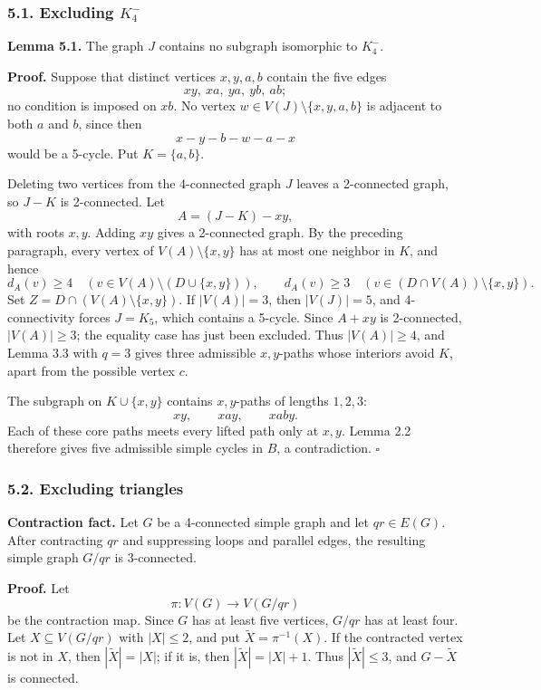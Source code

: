 \documentclass[
  11pt]{article}
\let\papersubsection\subsubsection
\renewcommand{\subsubsection}{\Needspace{7\baselineskip}\papersubsection}
\begin{document}
\subsubsection{\texorpdfstring{5.1. Excluding
\(K_4^-\)}{5.1. Excluding K\_4\^{}-}}\label{excluding-k_4-}

\textbf{Lemma 5.1.} The graph \(J\) contains no subgraph isomorphic to
\(K_4^-\).

\textbf{Proof.} Suppose that distinct vertices \(x,y,a,b\) contain the
five edges \[
 xy,\ xa,\ ya,\ yb,\ ab;
\] no condition is imposed on \(xb\). No vertex
\(w\in V(J)\setminus\{x,y,a,b\}\) is adjacent to both \(a\) and \(b\),
since then \[
 x-y-b-w-a-x
\] would be a 5-cycle. Put \(K=\{a,b\}\).


Deleting two vertices from the 4-connected graph \(J\) leaves a
2-connected graph, so \(J-K\) is 2-connected. Let \[
 A=(J-K)-xy,
\] with roots \(x,y\). Adding \(xy\) gives a 2-connected graph. By the
preceding paragraph, every vertex of \(V(A)\setminus\{x,y\}\) has at
most one neighbor in \(K\), and hence \[
 d_A(v)\ge4\quad(v\in V(A)\setminus(D\cup\{x,y\})),
 \qquad
 d_A(v)\ge3\quad
   (v\in (D\cap V(A))\setminus\{x,y\}). \tag{5.1}
\] Set \(Z=D\cap(V(A)\setminus\{x,y\})\). If \(|V(A)|=3\), then
\(|V(J)|=5\), and 4-connectivity forces \(J=K_5\), which contains a
5-cycle. Since \(A+xy\) is 2-connected, \(|V(A)|\ge3\); the equality
case has just been excluded. Thus \(|V(A)|\ge4\), and Lemma 3.3 with
\(q=3\) gives three admissible \(x,y\)-paths whose interiors avoid
\(K\), apart from the possible vertex \(c\).

The subgraph on \(K\cup\{x,y\}\) contains \(x,y\)-paths of lengths
\(1,2,3\): \[
 xy,
 \qquad xay,
 \qquad xaby.
\] Each of these core paths meets every lifted path only at \(x,y\).
Lemma 2.2 therefore gives five admissible simple cycles in \(B\), a
contradiction. \(\square\)

\subsubsection{5.2. Excluding triangles}\label{excluding-triangles}

\textbf{Contraction fact.} Let \(G\) be a 4-connected simple graph and
let \(qr\in E(G)\). After contracting \(qr\) and suppressing loops and
parallel edges, the resulting simple graph \(G/qr\) is 3-connected.

\textbf{Proof.} Let \[
 \pi:V(G)\longrightarrow V(G/qr)
\] be the contraction map. Since \(G\) has at least five vertices,
\(G/qr\) has at least four. Let \(X\subseteq V(G/qr)\) with \(|X|\le2\),
and put \(\widetilde X=\pi^{-1}(X)\). If the contracted vertex is not in
\(X\), then \(|\widetilde X|=|X|\); if it is, then
\(|\widetilde X|=|X|+1\). Thus \(|\widetilde X|\le3\), and
\(G-\widetilde X\) is connected.
\end{document}
